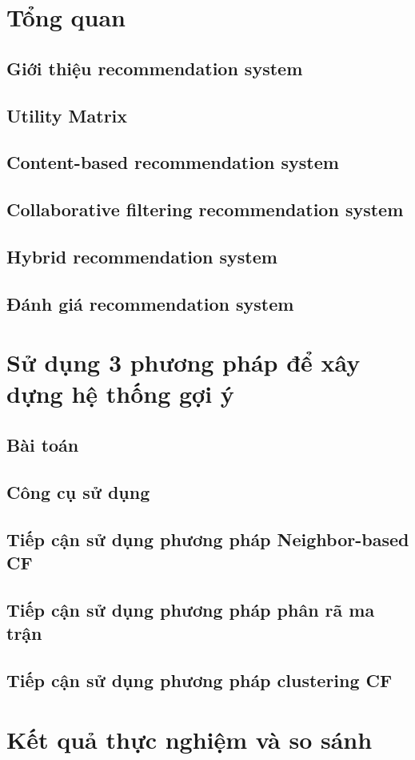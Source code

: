 \chapter{Tổng quan}
\label{chap:problem}
\section{Giới thiệu recommendation system}

\section{Utility Matrix}

\section{Content-based recommendation system}

\section{Collaborative filtering recommendation system}

\section{Hybrid recommendation system}

\section{Đánh giá recommendation system}


\chapter{Sử dụng 3 phương pháp để xây dựng hệ thống gợi ý}
\section{Bài toán}

\section{Công cụ sử dụng}

\section{Tiếp cận sử dụng phương pháp Neighbor-based CF}

\section{Tiếp cận sử dụng phương pháp phân rã ma trận}

\section{Tiếp cận sử dụng phương pháp clustering CF}

\chapter{Kết quả thực nghiệm và so sánh}

